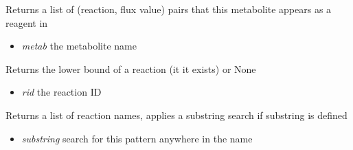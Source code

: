 \documentclass[a4paper,11pt,english]{sphinxmanual}
\begin{document}
\begin{fulllineitems}
\begin{fulllineitems}
\begin{itemize}
\end{itemize}

\end{fulllineitems}


\begin{fulllineitems}
\label{modules_doc:cbmpy.CBModel.Model.getReactionIdsAssociatedWithSpecies}
Returns a list of (reaction, flux value) pairs that this metabolite appears as a reagent in
\begin{itemize}
\item {} 
\emph{metab} the metabolite name

\end{itemize}

\end{fulllineitems}


\begin{fulllineitems}
\label{modules_doc:cbmpy.CBModel.Model.getReactionLowerBound}
Returns the lower bound of a reaction (it it exists) or None
\begin{itemize}
\item {} 
\emph{rid} the reaction ID

\end{itemize}

\end{fulllineitems}


\begin{fulllineitems}
\label{modules_doc:cbmpy.CBModel.Model.getReactionNames}
Returns a list of reaction names, applies a substring search if substring is defined
\begin{itemize}
\item {} 
\emph{substring} search for this pattern anywhere in the name

\end{itemize}

\end{fulllineitems}



\end{fulllineitems}
\end{document}
